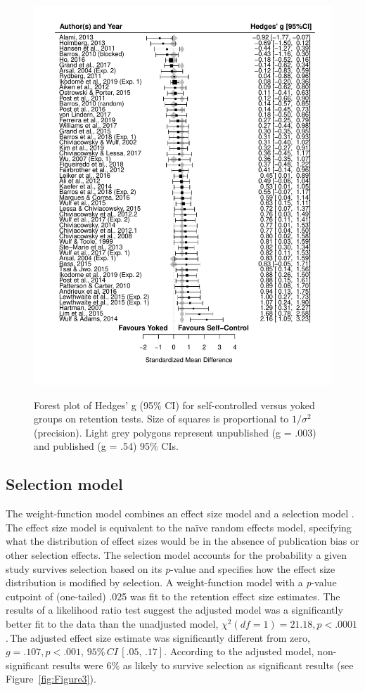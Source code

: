 \documentclass[man,floatsintext,hidelinks]{apa7}
\begin{document}
\begin{figure}[H]
	\caption{Forest plot of Hedges' g (95\% CI) for self-controlled versus yoked groups on retention tests. Size of squares is proportional to $1/\sigma^2$ (precision). Light grey polygons represent unpublished (g = .003) and published (g = .54) 95\% CIs.}
	\centering
	\includegraphics[scale=0.9]{figs/fig2.pdf}
    \label{fig:Figure2}
\end{figure}

\subsection{Selection model}
The weight-function model combines an effect size model and a selection model \parencite{Hedges1996-yh}. The effect size model is equivalent to the naïve random effects model, specifying what the distribution of effect sizes would be in the absence of publication bias or other selection effects. The selection model accounts for the probability a given study survives selection based on its \emph{p}-value and specifies how the effect size distribution is modified by selection. A weight-function model with a \emph{p}-value cutpoint of (one-tailed) .025 was fit to the retention effect size estimates. The results of a likelihood ratio test suggest the adjusted model was a significantly better fit to the data than the unadjusted model, $\chi^2(df = 1) = 21.18, p < .0001$.\footnotemark \,The adjusted effect size estimate was significantly different from zero, $g = .107, p < .001, \,95\%\,CI \,[.05, \,.17]$. According to the adjusted model, non-significant results were 6\% as likely to survive selection as significant results (see Figure~\ref{fig:Figure3}).
\end{document}
